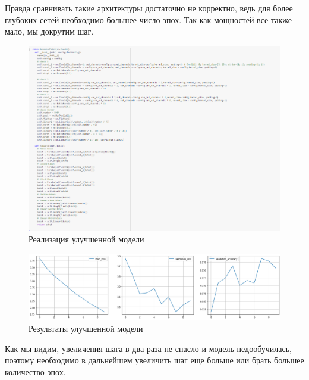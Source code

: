 \documentclass[a4paper,12pt]{article}
\begin{document}
		Правда сравнивать такие архитектуры достаточно не корректно, ведь для более глубоких сетей необходимо большее число эпох. Так как мощностей все также мало, мы докрутим шаг.
	\begin{figure}[H]
		\centering
		\includegraphics[width=1\linewidth]{Image/Advanced_model}
		\caption{Реализация улучшенной модели}
		\label{fig:advancedmodel}
	\end{figure}
	
	\begin{figure}[H]
	\centering
	\includegraphics[width=1.2\linewidth]{Image/Advanced_model_train.png}
	\caption{Результаты улучшенной модели}
	\label{fig:featurizer1}
	\end{figure}
	Как мы видим, увеличения шага в два раза не спасло и модель недообучилась, поэтому необходимо в дальнейшем увеличить шаг еще больше или брать большее количество эпох. 
\end{document}
